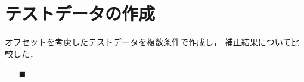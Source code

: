\documentclass[twocolumn,a4j]{jsarticle}
\begin{document}
\newpage







\section{テストデータの作成}
オフセットを考慮したテストデータを複数条件で作成し，
補正結果について比較した．

\begin{itemize}
    \item [$\blacksquare$] 
\end{itemize}
\end{document}
